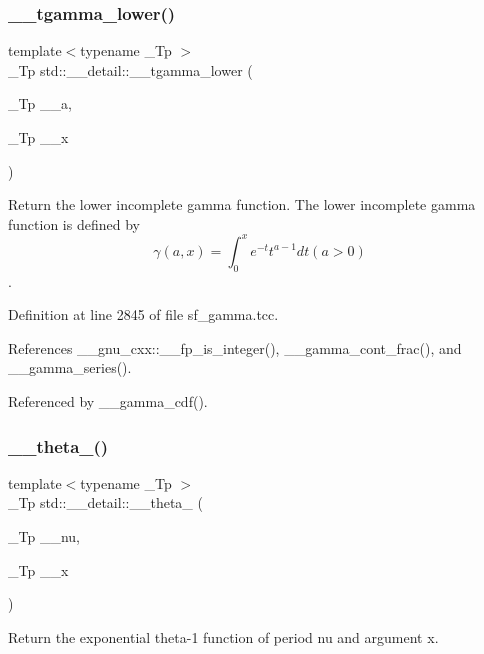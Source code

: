 \subsubsection{\texorpdfstring{\+\_\+\+\_\+tgamma\+\_\+lower()}{\_\_tgamma\_lower()}}
{\footnotesize\ttfamily template$<$typename \+\_\+\+Tp $>$ \\
\+\_\+\+Tp std\+::\+\_\+\+\_\+detail\+::\+\_\+\+\_\+tgamma\+\_\+lower (\begin{DoxyParamCaption}\item[{\+\_\+\+Tp}]{\+\_\+\+\_\+a,  }\item[{\+\_\+\+Tp}]{\+\_\+\+\_\+x }\end{DoxyParamCaption})}



Return the lower incomplete gamma function. The lower incomplete gamma function is defined by \[ \gamma(a,x) = \int_0^x e^{-t}t^{a-1}dt (a > 0) \]. 



Definition at line 2845 of file sf\+\_\+gamma.\+tcc.



References \+\_\+\+\_\+gnu\+\_\+cxx\+::\+\_\+\+\_\+fp\+\_\+is\+\_\+integer(), \+\_\+\+\_\+gamma\+\_\+cont\+\_\+frac(), and \+\_\+\+\_\+gamma\+\_\+series().



Referenced by \+\_\+\+\_\+gamma\+\_\+cdf().

\mbox{\label{namespacestd_1_1____detail_af7f54a82d2e5f0d8758cf53ebb2500e8}} 
\subsubsection{\texorpdfstring{\+\_\+\+\_\+theta\+\_()}{\_\_theta\_1()}}
{\footnotesize\ttfamily template$<$typename \+\_\+\+Tp $>$ \\
\+\_\+\+Tp std\+::\+\_\+\+\_\+detail\+::\+\_\+\+\_\+theta\+\_ (\begin{DoxyParamCaption}\item[{\+\_\+\+Tp}]{\+\_\+\+\_\+nu,  }\item[{\+\_\+\+Tp}]{\+\_\+\+\_\+x }\end{DoxyParamCaption})}

Return the exponential theta-\/1 function of period {\ttfamily nu} and argument {\ttfamily x}.

